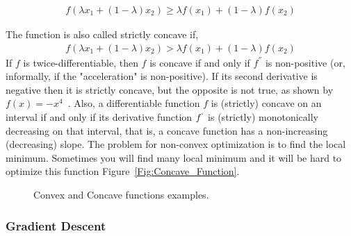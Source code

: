 \begin{description}
\begin{equation}\label{eq:concave_fun}
  \begin{split}
f(\lambda x_1 + (1-\lambda)x_2) \geq \lambda f(x_1) + (1 - \lambda) f(x_2)
  \end{split}
\end{equation}

The function is also called strictly concave if,
\begin{equation}\label{eq:concave_fun_strictly}
  \begin{split}
f(\lambda x_1 + (1-\lambda)x_2) > \lambda f(x_1) + (1 - \lambda) f(x_2)
  \end{split}
\end{equation}
If $f$ is twice-differentiable, then $f$ is concave if and only if $f^{''}$ is non-positive (or, informally, if the "acceleration" is non-positive). If its second derivative is negative then it is strictly concave, but the opposite is not true, as shown by $f(x) = −x^4$~\cite{Wiki_Concave_Function}. Also, a differentiable function $f$ is (strictly) concave on an interval if and only if its derivative function $f^`$ is (strictly) monotonically decreasing on that interval, that is, a concave function has a non-increasing (decreasing) slope. The problem for non-convex optimization is to find the local minimum. Sometimes you will find many local minimum and it will be hard to optimize this function Figure~\ref{Fig:Concave_Function}.

%

\end{description}

\begin{figure}[t]
  \centering
\caption{Convex and Concave functions examples.}
\end{figure}
\subsubsection{Gradient Descent}

